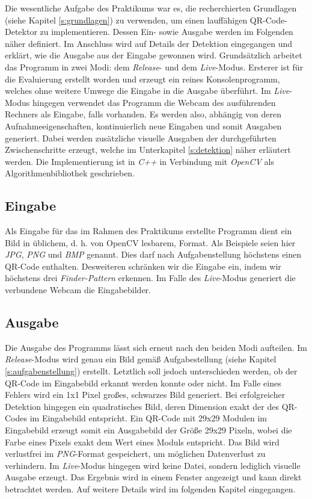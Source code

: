 \documentclass[a4paper, oneside, 12pt]{article}
\begin{document}
Die wesentliche Aufgabe des Praktikums war es, die recherchierten Grundlagen (siehe Kapitel \ref{s:grundlagen}) zu verwenden, um einen lauffähigen QR-Code-Detektor zu implementieren. Dessen Ein- sowie Ausgabe werden im Folgenden näher definiert.
Im Anschluss wird auf Details der Detektion eingegangen und erklärt, wie die Ausgabe aus der Eingabe gewonnen wird.
Grundsätzlich arbeitet das Programm in zwei Modi: dem \emph{Release}- und dem \emph{Live}-Modus.
Ersterer ist für die Evaluierung erstellt worden und erzeugt ein reines Konsolenprogramm, welches ohne weitere Umwege die Eingabe in die Ausgabe überführt.
Im \emph{Live}-Modus hingegen verwendet das Programm die Webcam des ausführenden Rechners als Eingabe, falls vorhanden. Es werden also, abhängig von deren Aufnahmeeigenschaften, kontinuierlich neue Eingaben und somit Ausgaben generiert. Dabei werden zusätzliche visuelle Ausgaben der durchgeführten Zwischenschritte erzeugt, welche im Unterkapitel \ref{s:detektion} näher erläutert werden.
Die Implementierung ist in \emph{C++} \cite{stroustrup1995c++} in Verbindung mit \emph{OpenCV} \cite{bradski2008learning} als Algorithmenbibliothek geschrieben.

\subsection{Eingabe}
\label{s:eingabe}

Als Eingabe für das im Rahmen des Praktikums erstellte Programm dient ein Bild in üblichem, d. h. von OpenCV lesbarem, Format. Als Beispiele seien hier \emph{JPG}, \emph{PNG} und \emph{BMP} genannt.
Dies darf nach Aufgabenstellung höchstens einen QR-Code enthalten.
Desweiteren schränken wir die Eingabe ein, indem wir höchstens drei \emph{Finder-Pattern} erkennen.
Im Falle des \emph{Live}-Modus generiert die verbundene Webcam die Eingabebilder.

\subsection{Ausgabe}
\label{s:ausgabe}

Die Ausgabe des Programms lässt sich erneut nach den beiden Modi aufteilen.
Im \emph{Release}-Modus wird genau ein Bild gemäß Aufgabestellung (siehe Kapitel \ref{s:aufgabenstellung}) erstellt. Letztlich soll jedoch unterschieden werden, ob der QR-Code im Eingabebild erkannt werden konnte oder nicht. Im Falle eines Fehlers wird ein 1x1 Pixel großes, schwarzes Bild generiert. Bei erfolgreicher Detektion hingegen ein quadratisches Bild, deren Dimension exakt der des QR-Codes im Eingabebild entspricht.
Ein QR-Code mit 29x29 Modulen im Eingabebild erzeugt somit ein Ausgabebild der Größe 29x29 Pixeln, wobei die Farbe eines Pixels exakt dem Wert eines Moduls entspricht.
Das Bild wird verlustfrei im \emph{PNG}-Format gespeichert, um möglichen Datenverlust zu verhindern.
Im \emph{Live}-Modus hingegen wird keine Datei, sondern lediglich visuelle Ausgabe erzeugt. Das Ergebnis wird in einem Fenster angezeigt und kann direkt betrachtet werden. Auf weitere Details wird im folgenden Kapitel eingegangen.
\end{document}
